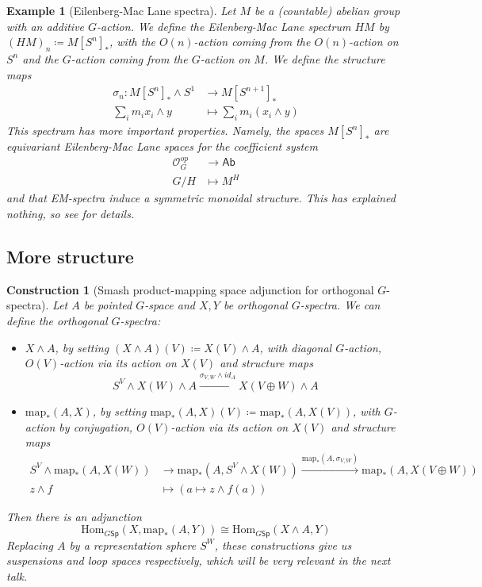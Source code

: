 \documentclass{scrartcl}
\newcommand{\Hom}{\mathrm{Hom}}
\newtheorem{ex}[subsection]{Example}
\newtheorem{cons}[subsection]{Construction}
\begin{document}
\begin{ex}[Eilenberg-Mac Lane spectra]
    Let $M$ be a (countable) abelian group with an additive $G$-action. We define the Eilenberg-Mac Lane spectrum $HM$ by $(HM)_n\coloneqq M[S^n]_*$, with the $O(n)$-action coming from the $O(n)$-action on $S^n$ and the $G$-action coming from the $G$-action on $M$. We define the structure maps
    \begin{align*}
        \sigma_n: M[S^n]_*\wedge S^1&\to M[S^{n+1}]_* \\
        \sum_i m_ix_i \wedge y &\mapsto \sum_i m_i(x_i\wedge y)
    \end{align*}
    This spectrum has more important properties. Namely, the spaces $M[S^n]_*$ are equivariant Eilenberg-Mac Lane spaces for the coefficient system 
    \begin{align*}
        \mathcal{O}_G^{op}&\to \mathsf{Ab} \\
        G/H&\mapsto M^H
    \end{align*}
    and that EM-spectra induce a symmetric monoidal structure. This has explained nothing, so see \cite[2.13]{Sch23} for details.
\end{ex}

\subsection*{More structure}

\begin{cons}[Smash product-mapping space adjunction for orthogonal $G$-spectra]
    Let $A$ be pointed $G$-space and $X,Y$ be orthogonal $G$-spectra. We can define the orthogonal $G$-spectra:
    \begin{itemize}
        \item $X\wedge A$, by setting $(X\wedge A)(V)\coloneqq X(V)\wedge A$, with diagonal $G$-action, $O(V)$-action via its action on $X(V)$ and structure maps $$S^V\wedge X(W)\wedge A\xrightarrow{\sigma_{V,W}\wedge id_A} X(V\oplus W)\wedge A$$
        \item $\text{map}_*(A,X)$, by setting $\text{map}_*(A,X)(V)\coloneqq \text{map}_*(A,X(V))$, with $G$-action by conjugation, $O(V)$-action via its action on $X(V)$ and structure maps 
        \begin{align*}
            S^V\wedge \text{map}_*(A, X(W))&\to \text{map}_*(A, S^V\wedge X(W))\xrightarrow{\text{map}_*(A, \sigma_{V,W})} \text{map}_*(A, X(V\oplus W)) \\
            z\wedge f&\mapsto (a\mapsto z\wedge f(a))
        \end{align*}
    \end{itemize}
    Then there is an adjunction $$\Hom_{G\mathsf{Sp}}(X, \text{map}_*(A,Y))\cong\Hom_{G\mathsf{Sp}}(X\wedge A, Y)$$
    Replacing $A$ by a representation sphere $S^W$, these constructions give us \textit{suspensions} and \textit{loop spaces} respectively, which will be very relevant in the next talk.
\end{cons}
\end{document}
